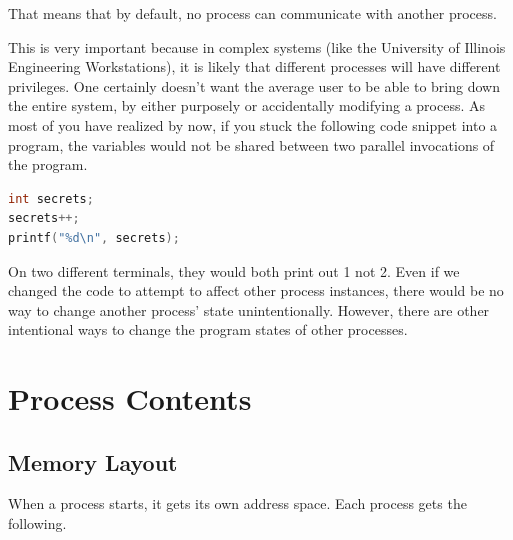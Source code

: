 That means that by default, no process can communicate with another process.

This is very important because in complex systems (like the University of Illinois Engineering Workstations), it is likely that different processes will have different privileges.
One certainly doesn't want the average user to be able to bring down the entire system, by either purposely or accidentally modifying a process.
As most of you have realized by now, if you stuck the following code snippet into a program, the variables would not be shared between two parallel invocations of the program.

\begin{lstlisting}[language=C]
int secrets;
secrets++;
printf("%d\n", secrets);
\end{lstlisting}

On two different terminals, they would both print out 1 not 2.
Even if we changed the code to attempt to affect other process instances, there would be no way to change another process' state unintentionally.
However, there are other intentional ways to change the program states of other processes.

\section{Process Contents}

\subsection{Memory Layout}

When a process starts, it gets its own address space.
Each process gets the following.

